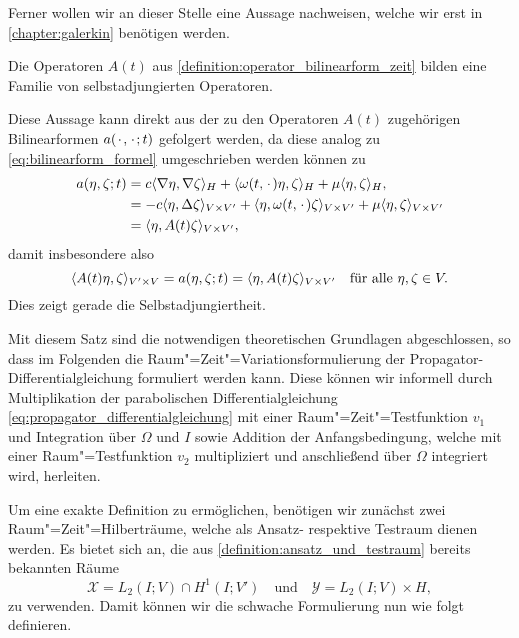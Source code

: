 \documentclass[../main.tex]{subfiles}
\begin{document}
Ferner wollen wir an dieser Stelle eine Aussage nachweisen, welche wir erst in \cref{chapter:galerkin} benötigen werden.

\begin{Lemma}
\label{lemma:operator_selbstadjungiert}
    Die Operatoren $A(t)$ aus \cref{definition:operator_bilinearform_zeit} bilden eine Familie von selbstadjungierten Operatoren.

    \begin{Beweis}
        Diese Aussage kann direkt aus der zu den Operatoren $A(t)$ zugehörigen Bilinearformen $a(\blank, \blank; t)$ gefolgert werden, da diese analog zu \cref{eq:bilinearform_formel} umgeschrieben werden können zu
        \begin{equation}
        \begin{aligned}
            a(\eta, \zeta; t)
            &= c\skp{\grad \eta}{\grad \zeta}{H} + \skp{\omega(t, \blank) \eta}{\zeta}{H} + \mu \skp{\eta}{\zeta}{H},
            \\&= - c\skp{\eta}{\Delta \zeta}{V \times V'} + \skp{\eta}{\omega(t, \blank) \zeta}{V \times V'} + \mu \skp{\eta}{\zeta}{V \times V'}
            \\&= \skp{\eta}{A(t) \zeta}{V \times V'},
        \end{aligned}
        \end{equation}
        damit insbesondere also
        \begin{equation}
            \skp{A(t)\eta}{\zeta}{V' \times V} = a(\eta, \zeta; t) = \skp{\eta}{A(t) \zeta}{V \times V'} \quad \fa \eta, \zeta \in V.
        \end{equation}
        Dies zeigt gerade die Selbstadjungiertheit.
    \end{Beweis}
\end{Lemma}

Mit diesem Satz sind die notwendigen theoretischen Grundlagen abgeschlossen, so dass im Folgenden die Raum"=Zeit"=Variationsformulierung der Propagator-Differentialgleichung formuliert werden kann.
Diese können wir informell durch Multiplikation der parabolischen Differentialgleichung \cref{eq:propagator_differentialgleichung} mit einer Raum"=Zeit"=Testfunktion $v_{1}$ und Integration über $\Omega$ und $I$ sowie Addition der Anfangsbedingung, welche mit einer Raum"=Testfunktion $v_{2}$ multipliziert und anschließend über $\Omega$ integriert wird, herleiten.

Um eine exakte Definition zu ermöglichen, benötigen wir zunächst zwei Raum"=Zeit"=Hilberträume, welche als Ansatz- respektive Testraum dienen werden.
Es bietet sich an, die aus \cref{definition:ansatz_und_testraum} bereits bekannten Räume
\begin{equation}
    \label{eq:raum_zeit_ansatzraum_testraum}
    \mathcal X = L_{2}(I; V) \cap H^{1}(I; V')
    \quad \text{und} \quad
    \mathcal Y = L_{2}(I; V) \times H,
\end{equation}
zu verwenden.
Damit können wir die schwache Formulierung nun wie folgt definieren.
\end{document}
